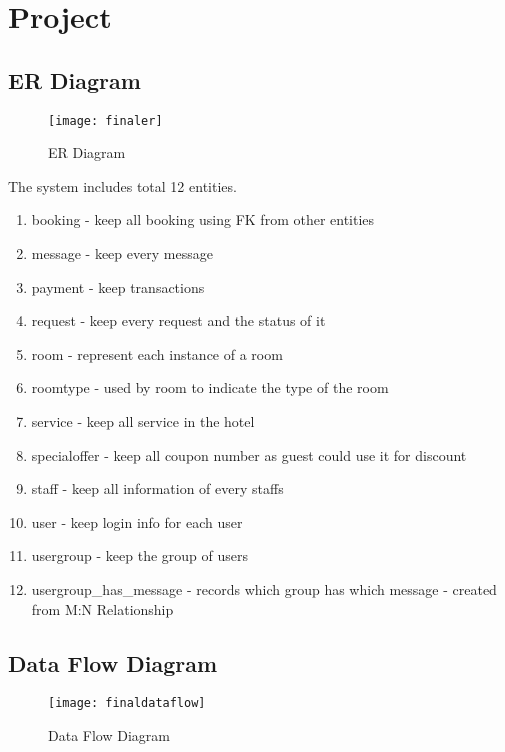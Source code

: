 
\chapter{Project}

\section{ER Diagram}
\begin{center}

	\begin{figure}[!h]
		\texttt{[image: finaler]}
	\caption{ER Diagram}
	\end{figure}
\end{center}


	The system includes total 12 entities.
	\begin{enumerate}
		\item booking - keep all booking using FK from other entities
		\item message - keep every message
		\item payment - keep transactions
		\item request - keep every request and the status of it
		\item room - represent each instance of a room
		\item roomtype - used by room to indicate the type of the room
		\item service - keep all service in the hotel
		\item specialoffer - keep all coupon number as guest could use it for discount
		\item staff - keep all information of every staffs
		\item user - keep login info for each user
		\item usergroup - keep the group of users
		\item usergroup\_has\_message - records which group has which message - created from M:N Relationship
	\end{enumerate}

\newpage
\section{Data Flow Diagram}
	\begin{center}
	\begin{figure}[h]
		\texttt{[image: finaldataflow]}
	\caption{Data Flow Diagram}
	\end{figure}
	\end{center}

